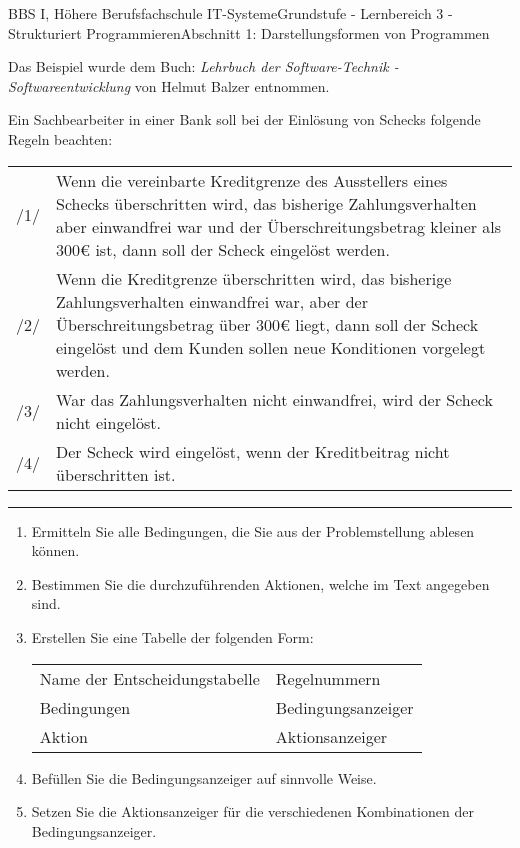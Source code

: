 \documentclass[oneside,openany,headings=optiontotoc,11pt,numbers=noenddot]{scrreprt}
\begin{document}
		\begin{worksheet}{BBS I, Höhere Berufsfachschule IT-Systeme}{Grundstufe - Lernbereich 3 - Strukturiert Programmieren}{Abschnitt 1: Darstellungsformen von Programmen}
			\begin{framed}
				\noindent
				\footnotesize{Das Beispiel wurde dem Buch: \textit{Lehrbuch der Software-Technik - Softwareentwicklung} von Helmut Balzer entnommen.}\\
				 \par\noindent\normalsize
				 Ein Sachbearbeiter in einer Bank soll bei der Einlösung von Schecks folgende Regeln beachten:\\
				\begin{tabularx}{\textwidth}{lX}
					/1/ & Wenn die vereinbarte Kreditgrenze des Ausstellers eines Schecks überschritten wird, das bisherige Zahlungsverhalten aber einwandfrei war und der Überschreitungsbetrag kleiner als 300\euro{} ist, dann soll der Scheck eingelöst werden.\\
				 	/2/ & Wenn die Kreditgrenze überschritten wird, das bisherige Zahlungsverhalten einwandfrei war, aber der Überschreitungsbetrag über 300\euro{} liegt, dann soll der Scheck eingelöst und dem Kunden sollen neue Konditionen vorgelegt werden.\\
				 	/3/ & War das Zahlungsverhalten nicht einwandfrei, wird der Scheck nicht eingelöst.\\
				 	/4/ & Der Scheck wird eingelöst, wenn der Kreditbeitrag nicht überschritten ist.
				\end{tabularx}
			 	\rule{0.95\textwidth}{0.1pt}
			 	\begin{enumerate}
			 		\item Ermitteln Sie alle Bedingungen, die Sie aus der Problemstellung ablesen können.
			 		\item Bestimmen Sie die durchzuführenden Aktionen, welche im Text angegeben sind.
			 		\item Erstellen Sie eine Tabelle der folgenden Form:
			 		\\
			 		\begin{tabularx}{\textwidth}{|L{4cm}|L{4cm}|}
			 			 Name der Entscheidungstabelle & Regelnummern\\
			 			Bedingungen & Bedingungsanzeiger\\
			 			Aktion & Aktionsanzeiger\\
			 		\end{tabularx}
			 		\item Befüllen Sie die Bedingungsanzeiger auf sinnvolle Weise.
			 		\item Setzen Sie die Aktionsanzeiger für die verschiedenen Kombinationen der Bedingungsanzeiger.
			 	\end{enumerate}
			\end{framed}
		\end{worksheet}
\end{document}
